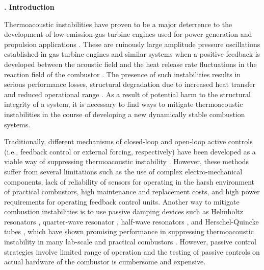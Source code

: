 \documentclass[twocolumn,10pt]{article} %
\renewcommand{\section}%
              [1]%
              {%
               \bgroup%
               \flushleft%
               \small\bf%
               \stepcounter{section}%
               \arabic{section}. #1%
               \par%
               \egroup%
              }%
\begin{document}

\clearpage

\section{Introduction} \addvspace{10pt}

Thermoacoustic instabilities have proven to be a major deterrence to the development of low-emission gas turbine engines used for power generation and propulsion applications \cite{lieuwen2005combustion}. These are ruinously large amplitude pressure oscillations  established in gas turbine engines and similar systems when a positive feedback is developed between the acoustic field and the heat release rate fluctuations in the reaction field of the combustor \cite{sujith2021thermoacoustic}. The presence of such instabilities results in serious performance losses, structural degradation due to increased heat transfer and reduced operational range \cite{culick1991combustion}. As a result of potential harm to the structural integrity of a system, it is necessary to find ways to mitigate thermoacoustic instabilities in the course of developing a new dynamically stable combustion systems.

Traditionally, different mechanisms of closed-loop and open-loop active controls (i.e., feedback control or external forcing, respectively) have been developed as a viable way of suppressing thermoacoustic instability \cite{ mcmanus1993review, dowling2005feedback}. However, these methods suffer from several limitations such as the use of complex electro-mechanical components, lack of reliability of sensors for operating in the harsh environment of practical combustors, high maintenance and replacement costs, and high power requirements for operating feedback control units. Another way to mitigate combustion instabilities is to use passive damping devices such as Helmholtz resonators \cite{dupere2005use}, quarter-wave resonator \cite{park2010nonlinear}, half-wave resonators \cite{park2009optimal}, and Herschel-Quincke tubes \cite{park2008thermo}, which have shown promising performance in suppressing thermoacoustic instability in many lab-scale and practical combustors \cite{bellucci2004use}. However, passive control strategies involve limited range of operation and the testing of passive controls on actual hardware of the combustor is cumbersome and expensive. 
\end{document}
